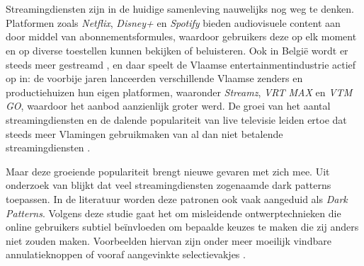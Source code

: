 
\chapter{}%
\label{ch:inleiding}

Streamingdiensten zijn in de huidige samenleving nauwelijks nog weg te denken. Platformen zoals \emph{Netflix}, \emph{Disney+} en \emph{Spotify} bieden audiovisuele content aan door middel van abonnementsformules, waardoor gebruikers deze op elk moment en op diverse toestellen kunnen bekijken of beluisteren. Ook in België wordt er steeds meer gestreamd \autocite{BNA2025}, en daar speelt de Vlaamse entertainmentindustrie actief op in: de voorbije jaren lanceerden verschillende Vlaamse zenders en productiehuizen hun eigen platformen, waaronder \emph{Streamz}, \emph{VRT MAX} en \emph{VTM GO}, waardoor het aanbod aanzienlijk groter werd. De groei van het aantal streamingdiensten en de dalende populariteit van live televisie \autocite{Digimeter2024} leiden ertoe dat steeds meer Vlamingen gebruikmaken van al dan niet betalende streamingdiensten \autocite{BNA2025}.

\vspace{1em}
Maar deze groeiende populariteit brengt nieuwe gevaren met zich mee. Uit onderzoek van \textcite{FODEconomie2024} blijkt dat veel streamingdiensten zogenaamde dark patterns toepassen. In de literatuur worden deze patronen ook vaak aangeduid als \emph{Dark Patterns}. Volgens deze studie gaat het om misleidende ontwerptechnieken die online gebruikers subtiel beïnvloeden om bepaalde keuzes te maken die zij anders niet zouden maken. Voorbeelden hiervan zijn onder meer moeilijk vindbare annulatieknoppen of vooraf aangevinkte selectievakjes \autocite{FODEconomie2024}.

%

